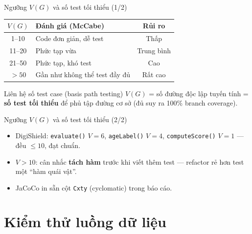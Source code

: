 \documentclass[aspectratio=169,12pt]{beamer}
\begin{document}
\begin{frame}{Ngưỡng $V(G)$ và số test tối thiểu (1/2)}
  \begin{center}
  \small
  \begin{tabular}{clc}
    \toprule
    $V(G)$ & \textbf{Đánh giá (McCabe)} & \textbf{Rủi ro} \\
    \midrule
    1--10  & Code đơn giản, dễ test          & Thấp \\
    11--20 & Phức tạp vừa                    & Trung bình \\
    21--50 & Phức tạp, khó test              & Cao \\
    $>50$  & Gần như không thể test đầy đủ   & Rất cao \\
    \bottomrule
  \end{tabular}
  \end{center}

  \vspace{0.3em}
  \begin{block}{Liên hệ số test case (basis path testing)}
    $V(G)$ = số đường độc lập tuyến tính = \textbf{số test tối thiểu}
    để phủ tập đường cơ sở (đủ suy ra 100\% branch coverage).
  \end{block}
\end{frame}

\begin{frame}{Ngưỡng $V(G)$ và số test tối thiểu (2/2)}
  \begin{itemize}
    \item DigiShield: \texttt{evaluate()} $V=6$, \texttt{ageLabel()} $V=4$,
          \texttt{computeScore()} $V=1$ --- đều $\leq 10$, đạt chuẩn.
    \item $V > 10$: cân nhắc \textbf{tách hàm} trước khi viết thêm test ---
          refactor rẻ hơn test một ``hàm quái vật''.
    \item JaCoCo in sẵn cột \texttt{Cxty} (cyclomatic) trong báo cáo.
  \end{itemize}
\end{frame}

\section{Kiểm thử luồng dữ liệu}
\end{document}
